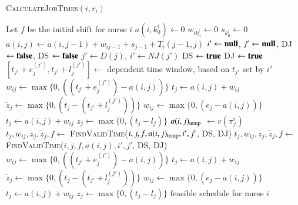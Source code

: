 \documentclass[a4paper,11pt,authoryear]{elsarticle}
\begin{document}
\begin{algorithm}[htbp!]
\caption{\textsc{CalculateJobTimes}$(i, r_i)$}
\label{alg:cjt}
\begin{algorithmic}[1]
	\State Let $f$ be the initial shift for nurse $i$
	\State $a(i,k_{0}^i) \gets 0$
	\State $w_{ik_{0}^i} \gets 0$
	\State $s_{k_{0}^i} \gets 0$
		\State $a(i,j) \gets a(i, j-1) + w_{ij-1} + s_{j-1} + T_i(j-1, j)$
		\State $i' \gets \textbf{null}$, $j' \gets \textbf{null}$, DJ $\gets \textbf{false}$, DS $\gets \textbf{false}$ %
			\State $j' \gets D(j)$, $i' \gets NJ(j')$
					\State DS $\gets \textbf{true}$
				\Else \hspace{0.2mm} DJ $\gets \textbf{true}$
				\EndIf
				\State $[t_{j'} + e_j^{(j')}, t_{j'} + l_j^{(j')}] \gets$ dependent time window, based on $t_{j'}$ set by $i'$
			\EndIf
		\EndIf %
				\State $w_{ij} \gets \max\{0, ((t_{j'} + e_j^{(j')}) - a(i,j))\}$
				\State $t_j \gets a(i,j) + w_{ij}$
				\State $\tilde{z}_j \gets \max\{0, (t_j - (t_{j'} + l_j^{(j')}))\}$
			\Else
				\State $w_{ij} \gets \max\{0, (e_j - a(i,j))\}$
				\State $t_j \gets a(i,j) + w_{ij}$
			\EndIf
			\State $z_j \gets \max\{0, (t_j - l_j)\}$
			\State $a(i,j)_{\textup{temp}}$ $\gets v(\pi_{f}^{i})$
			\State $t_j, w_{ij}, z_j, \tilde{z}_j, f \gets$ \textsc{FindValidTime}($i, j, f, a(i,j)_{\textup{temp}}, i', j'$, DS, DJ)
			\State $t_j, w_{ij}, z_j, \tilde{z}_j, f \gets$ \textsc{FindValidTime}($i, j, f, a(i,j), i', j'$, DS, DJ)
		\Else
				\State $w_{ij} \gets \max\{0, ((t_{j'} + e_j^{(j')}) - a(i,j))\}$
				\State $t_j \gets a(i,j) + w_{ij}$
				\State $\tilde{z}_j \gets \max\{0, (t_j - (t_{j'} + l_j^{(j')}))\}$
			\Else
				\State $w_{ij} \gets \max\{0, (e_j - a(i,j))\}$
				\State $t_j \gets a(i,j) + w_{ij}$
			\EndIf
			\State $z_j \gets \max\{0, (t_j - l_j)\}$
		\EndIf
	\EndFor
	\Return feasible schedule for nurse $i$
\end{algorithmic}
\end{algorithm}
\end{document}
